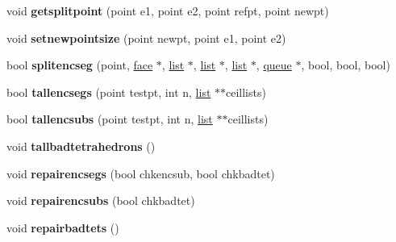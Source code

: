 \begin{DoxyCompactItemize}
\item 
\hypertarget{classtetgenmesh_a539ac7bbb82e0ea7a817de4981e78d37}{void {\bfseries getsplitpoint} (point e1, point e2, point refpt, point newpt)}\label{classtetgenmesh_a539ac7bbb82e0ea7a817de4981e78d37}

\item 
\hypertarget{classtetgenmesh_a9303be2f299366182dff6c8cf2dc91c6}{void {\bfseries setnewpointsize} (point newpt, point e1, point e2)}\label{classtetgenmesh_a9303be2f299366182dff6c8cf2dc91c6}

\item 
\hypertarget{classtetgenmesh_a4bb6612353a8956b80a50aa05f8123b8}{bool {\bfseries splitencseg} (point, \hyperlink{classtetgenmesh_1_1face}{face} $\ast$, \hyperlink{classtetgenmesh_1_1list}{list} $\ast$, \hyperlink{classtetgenmesh_1_1list}{list} $\ast$, \hyperlink{classtetgenmesh_1_1list}{list} $\ast$, \hyperlink{classtetgenmesh_1_1queue}{queue} $\ast$, bool, bool, bool)}\label{classtetgenmesh_a4bb6612353a8956b80a50aa05f8123b8}

\item 
\hypertarget{classtetgenmesh_a556fc00d804ee23c11ce12a6dffb0fe9}{bool {\bfseries tallencsegs} (point testpt, int n, \hyperlink{classtetgenmesh_1_1list}{list} $\ast$$\ast$ceillists)}\label{classtetgenmesh_a556fc00d804ee23c11ce12a6dffb0fe9}

\item 
\hypertarget{classtetgenmesh_abf0fe79501b054938c6ae23bd6ebba42}{bool {\bfseries tallencsubs} (point testpt, int n, \hyperlink{classtetgenmesh_1_1list}{list} $\ast$$\ast$ceillists)}\label{classtetgenmesh_abf0fe79501b054938c6ae23bd6ebba42}

\item 
\hypertarget{classtetgenmesh_a7c07c457e9940d5033dd7dc9dd0382a4}{void {\bfseries tallbadtetrahedrons} ()}\label{classtetgenmesh_a7c07c457e9940d5033dd7dc9dd0382a4}

\item 
\hypertarget{classtetgenmesh_a2eea31776294c2e33a7481ca69b978eb}{void {\bfseries repairencsegs} (bool chkencsub, bool chkbadtet)}\label{classtetgenmesh_a2eea31776294c2e33a7481ca69b978eb}

\item 
\hypertarget{classtetgenmesh_aed91a26cdc3f396a82254c75293456de}{void {\bfseries repairencsubs} (bool chkbadtet)}\label{classtetgenmesh_aed91a26cdc3f396a82254c75293456de}

\item 
\hypertarget{classtetgenmesh_a3a1aaafae0abfca51a56070536d3549a}{void {\bfseries repairbadtets} ()}\label{classtetgenmesh_a3a1aaafae0abfca51a56070536d3549a}


\end{DoxyCompactItemize}
